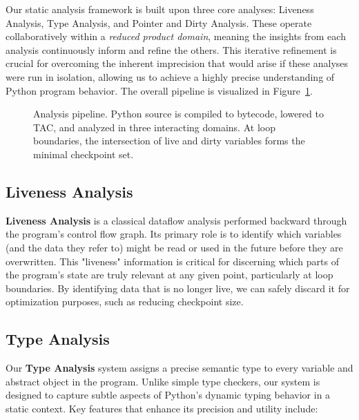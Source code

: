 Our static analysis framework is built upon three core analyses: Liveness Analysis, Type Analysis, and Pointer and Dirty Analysis. These operate collaboratively within a \emph{reduced product domain}, meaning the insights from each analysis continuously inform and refine the others. This iterative refinement is crucial for overcoming the inherent imprecision that would arise if these analyses were run in isolation, allowing us to achieve a highly precise understanding of Python program behavior. The overall pipeline is visualized in Figure~\ref{fig:overview}.

\begin{figure}[t]
    \centering
    
    \caption{Analysis pipeline. Python source is compiled to bytecode, lowered to TAC, and analyzed in three interacting domains. At loop boundaries, the intersection of live and dirty variables forms the minimal checkpoint set.}
    \label{fig:overview}
\end{figure}

\subsection{Liveness Analysis}

\textbf{Liveness Analysis} is a classical dataflow analysis performed backward through the program's control flow graph. Its primary role is to identify which variables (and the data they refer to) might be read or used in the future before they are overwritten. This "liveness" information is critical for discerning which parts of the program's state are truly relevant at any given point, particularly at loop boundaries. By identifying data that is no longer live, we can safely discard it for optimization purposes, such as reducing checkpoint size.

\subsection{Type Analysis}
\label{sec:typesystem}

Our \textbf{Type Analysis} system assigns a precise semantic type to every variable and abstract object in the program. Unlike simple type checkers, our system is designed to capture subtle aspects of Python's dynamic typing behavior in a static context. Key features that enhance its precision and utility include:

